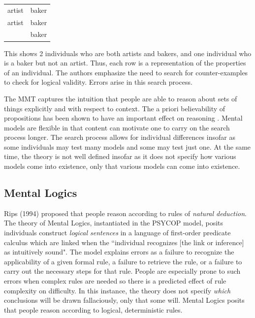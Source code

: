 \documentclass[10pt,letterpaper]{article}
\begin{document}
\begin{tabular}{l l}
artist & baker\\
artist & baker\\
 & baker\\
\end{tabular}

This shows 2 individuals who are both artists and bakers, and one individual who is a baker but not an artist. Thus, each row is a representation of the properties of an individual. The authors emphasize the need to search for counter-examples to check for logical validity. Errors arise in this search process.

The MMT captures the intuition that people are able to reason about sets of things explicitly and with respect to context.  The a priori believability of propositions has been shown to have an important effect on reasoning \cite{Oakhill1989}. Mental models are flexible in that content can motivate one to carry on the search process longer. The search process allows for individual differences insofar as some individuals may test many models and some may test just one. At the same time, the theory is not well defined insofar as it does not specify how various models come into existence, only that various models can come into existence.


\subsection{Mental Logics}

Rips (1994) proposed that people reason according to rules of \emph{natural deduction}. The theory of Mental Logics, instantiated in the PSYCOP model, posits individuals construct \emph{logical sentences} in a language of first-order predicate calculus which are linked when the ``individual recognizes [the link or inference] as intuitively sound". The model explains errors as a failure to recognize the applicability of a given formal rule, a failure to retrieve the rule, or a failure to carry out the necessary steps for that rule. People are especially prone to such errors when complex rules are needed so there is a predicted effect of rule complexity on difficulty. In this instance, the theory does not specify \emph{which} conclusions will be drawn fallaciously, only that some will. Mental Logics posits that people reason according to logical, deterministic rules. 
\end{document}
